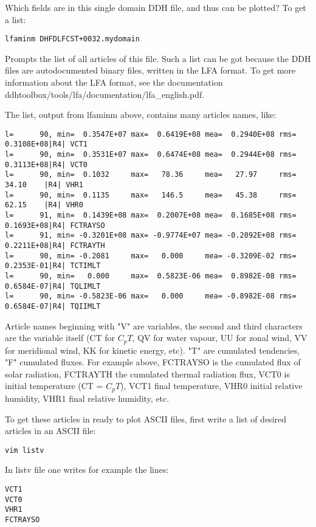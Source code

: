 \noi Which fields are in this single domain DDH file, and thus can be plotted? To get a list:
{\small \begin{verbatim} 
lfaminm DHFDLFCST+0032.mydomain
\end{verbatim}}
\noi Prompts the list of all articles of this file. Such a list can be got because the DDH files are autodocumented binary files, written in the LFA format. To get more information about the LFA format, see the documentation \newline
ddhtoolbox/tools/lfa/documentation/lfa\_english.pdf.

\p The list, output from lfaminm above, contains many articles names, like:
{\small \begin{verbatim} 
l=      90, min=  0.3547E+07 max=  0.6419E+08 mea=  0.2940E+08 rms=  0.3108E+08|R4| VCT1
l=      90, min=  0.3531E+07 max=  0.6474E+08 mea=  0.2944E+08 rms=  0.3113E+08|R4| VCT0
l=      90, min=  0.1032     max=   78.36     mea=   27.97     rms=   34.10    |R4| VHR1
l=      90, min=  0.1135     max=   146.5     mea=   45.38     rms=   62.15    |R4| VHR0
l=      91, min=  0.1439E+08 max=  0.2007E+08 mea=  0.1685E+08 rms=  0.1693E+08|R4| FCTRAYSO
l=      91, min= -0.3201E+08 max= -0.9774E+07 mea= -0.2092E+08 rms=  0.2211E+08|R4| FCTRAYTH
l=      90, min= -0.2081     max=   0.000     mea= -0.3209E-02 rms=  0.2353E-01|R4| TCTIMLT
l=      90, min=   0.000     max=  0.5823E-06 mea=  0.8982E-08 rms=  0.6584E-07|R4| TQLIMLT
l=      90, min= -0.5823E-06 max=   0.000     mea= -0.8982E-08 rms=  0.6584E-07|R4| TQIIMLT
\end{verbatim}}
\noi Article names beginning with "V" are variables, the second and third characters are the variable itself (CT for $C_p T$, QV for water vapour, UU for zonal wind, VV for meridional wind, KK for kinetic energy, etc). "T" are cumulated tendencies, "F" cumulated fluxes. For example above, FCTRAYSO is the cumulated flux of solar radiation, FCTRAYTH the cumulated thermal radiation flux, VCT0 is initial temperature (CT = $C_p T$), VCT1 final temperature, VHR0 initial relative humidity, VHR1 final relative humidity, etc.

\p To get these articles in ready to plot ASCII files, first write a list of desired articles in an ASCII file:
{\small \begin{verbatim} 
vim listv
\end{verbatim}}
\noi In listv file one writes for example the lines:
{\small \begin{verbatim} 
VCT1
VCT0
VHR1
FCTRAYSO
\end{verbatim}}

